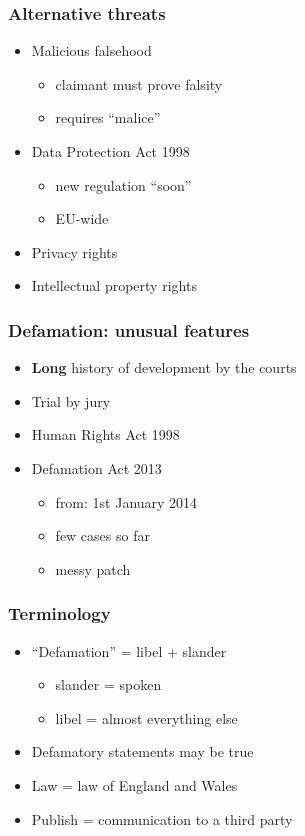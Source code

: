 \documentclass[ignorenonframetext,]{beamer}
\begin{document}
\begin{frame}
  \frametitle{Alternative threats}
  \begin{itemize}
  \item Malicious falsehood
    \begin{itemize}
    \item claimant must prove falsity
    \item requires ``malice''
    \end{itemize}
  \item Data Protection Act 1998
    \begin{itemize}
    \item new regulation ``soon''
    \item EU-wide
    \end{itemize}
  \item Privacy rights
  \item Intellectual property rights
  \end{itemize}
\end{frame}

\begin{frame}
  \frametitle{Defamation: unusual features}
  \begin{itemize}
  \item {\bf Long} history of development by the courts
  \item Trial by jury
  \item Human Rights Act 1998
  \item Defamation Act 2013
    \begin{itemize}
    \item from: 1st January 2014
    \item few cases so far
    \item messy patch
    \end{itemize}
  \end{itemize}
\end{frame}

\begin{frame}
\frametitle{Terminology}

\begin{itemize}
\item ``Defamation'' = libel + slander
  \begin{itemize}
  \item slander = spoken
  \item libel = almost everything else
  \end{itemize}
\item Defamatory statements may be true
\item Law = law of England and Wales
\item Publish = communication to a third party
\end{itemize}
\end{frame}
\end{document}
